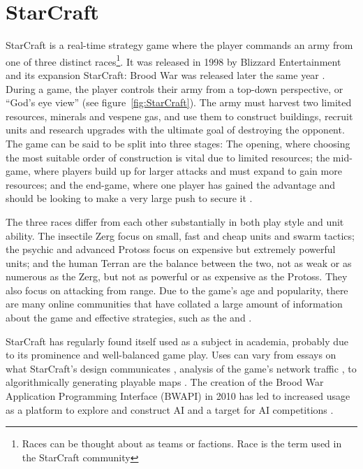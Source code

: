 \documentclass[11pt,openright,a4paper]{report}
\begin{document}
\section{StarCraft}
StarCraft is a real-time strategy game where the player commands an army from one of three distinct races\footnote{Races can be thought about as teams or factions. Race is the term used in the StarCraft community}. It was released in 1998 by Blizzard Entertainment and its expansion StarCraft: Brood War was released later the same year \cite{Blizzard}. During a game, the player controls their army from a top-down perspective, or ``God's eye view'' (see figure~\ref{fig:StarCraft}). The army must harvest two limited resources, minerals and vespene gas, and use them to construct buildings, recruit units and research upgrades with the ultimate goal of destroying the opponent. The game can be said to be split into three stages: The opening, where choosing the most suitable order of construction is vital due to limited resources; the mid-game, where players build up for larger attacks and must expand to gain more resources; and the end-game, where one player has gained the advantage and should be looking to make a very large push to secure it \cite{yi2011adaptive}.

The three races differ from each other substantially in both play style and unit ability. The insectile Zerg focus on small, fast and cheap units and swarm tactics; the psychic and advanced Protoss focus on expensive but extremely powerful units; and the human Terran are the balance between the two, not as weak or as numerous as the Zerg, but not as powerful or as expensive as the Protoss. They also focus on attacking from range.  Due to the game's age and popularity, there are many online communities that have collated a large amount of information about the game and effective strategies, such as the  and .

StarCraft has regularly found itself used as a subject in academia, probably due to its prominence and well-balanced game play.  Uses can vary from essays on what StarCraft's design communicates \cite{galloway2007starcraft}, analysis of the game's network traffic \cite{dainotti2005packet}, to algorithmically generating playable maps \cite{togelius2010multiobjective}. The creation of the Brood War Application Programming Interface (BWAPI) in 2010 \cite{bwapiMain} has led to increased usage as a platform to explore and construct AI and a target for AI competitions \cite{bwapiCompetitions}.
\end{document}
